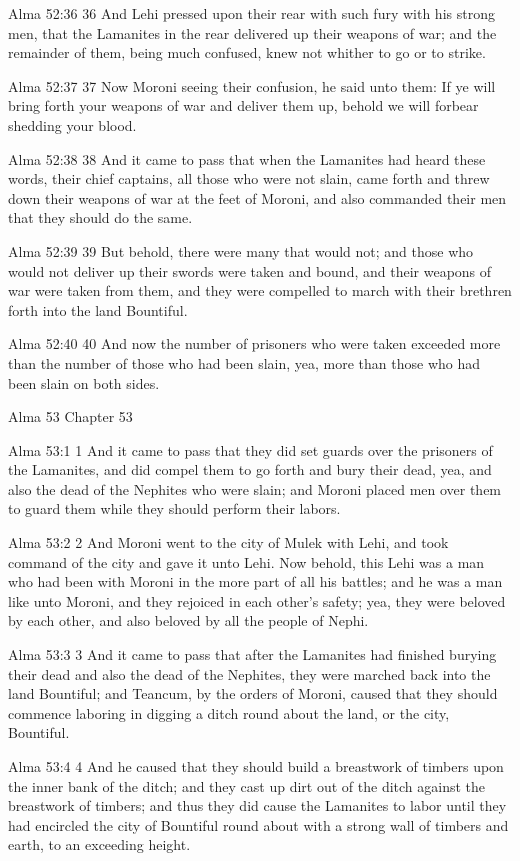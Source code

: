 Alma 52:36
 36 And Lehi pressed upon their rear with such fury with his
strong men, that the Lamanites in the rear delivered up their
weapons of war; and the remainder of them, being much confused,
knew not whither to go or to strike.

Alma 52:37
 37 Now Moroni seeing their confusion, he said unto them: If ye
will bring forth your weapons of war and deliver them up, behold
we will forbear shedding your blood.

Alma 52:38
 38 And it came to pass that when the Lamanites had heard these
words, their chief captains, all those who were not slain, came
forth and threw down their weapons of war at the feet of Moroni,
and also commanded their men that they should do the same.

Alma 52:39
 39 But behold, there were many that would not; and those who
would not deliver up their swords were taken and bound, and their
weapons of war were taken from them, and they were compelled to
march with their brethren forth into the land Bountiful.

Alma 52:40
 40 And now the number of prisoners who were taken exceeded more
than the number of those who had been slain, yea, more than those
who had been slain on both sides.

Alma 53
Chapter 53

Alma 53:1
 1 And it came to pass that they did set guards over the
prisoners of the Lamanites, and did compel them to go forth and
bury their dead, yea, and also the dead of the Nephites who were
slain; and Moroni placed men over them to guard them while they
should perform their labors.

Alma 53:2
 2 And Moroni went to the city of Mulek with Lehi, and took
command of the city and gave it unto Lehi. Now behold, this Lehi
was a man who had been with Moroni in the more part of all his
battles; and he was a man like unto Moroni, and they rejoiced in
each other's safety; yea, they were beloved by each other, and
also beloved by all the people of Nephi.

Alma 53:3
 3 And it came to pass that after the Lamanites had finished
burying their dead and also the dead of the Nephites, they were
marched back into the land Bountiful; and Teancum, by the orders
of Moroni, caused that they should commence laboring in digging a
ditch round about the land, or the city, Bountiful.

Alma 53:4
 4 And he caused that they should build a breastwork of timbers
upon the inner bank of the ditch; and they cast up dirt out of
the ditch against the breastwork of timbers; and thus they did
cause the Lamanites to labor until they had encircled the city of
Bountiful round about with a strong wall of timbers and earth, to
an exceeding height.

